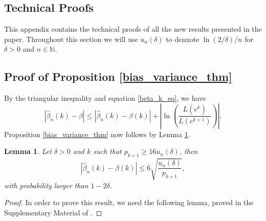 \documentclass[sn-mathphys-ay]{sn-jnl}%
\newtheorem{lemma}{Lemma}[section]
\newcommand{\N}{\mathbb{N}}
\begin{document}

\newpage

\setcounter{page}{1}

\begin{appendices}
\section{Technical Proofs}\label{sec:proofs}

This appendix contains the technical proofs of all the new results presented in the
paper. Throughout this section we will use $u_n(\delta)$ to denxote $\ln \left(
    {2/\delta } \right)/n$ for $\delta>0$ and $n\in\N$.

\subsection{Proof of Proposition \ref{bias_variance_thm}}

By the triangular inequality and equation \eqref{beta_k_eq}, we have
\begin{equation*}
    \left|\widehat{\beta}_n(k)-\beta\right| \leq
    \left|\widehat{\beta}_n(k)-\beta(k)\right| + \left| \ln\left(\frac{L(e^{k})}{L(e^{k+1})}\right) \right|.
\end{equation*}
Proposition \ref{bias_variance_thm} now follows by Lemma \ref{varianceBoundLemma}.

\begin{lemma}\label{varianceBoundLemma}
    Let \(\delta>0\) and \(k\) such that \(p_{k+1}\geq 16u_n(\delta)\), then
    \begin{equation}\label{varianceBoundEq}
        \left|\widehat{\beta}_n(k)-\beta(k)\right|\leq 6\sqrt{\frac{u_n (\delta)}{p_{k+1}}},
    \end{equation}
    with probability larger than \(1-2\delta\).
\end{lemma}
\begin{proof}
    In order to prove this result, we need the following lemma, proved in the
    Supplementary Material of \cite{Carpentier2015}.


\end{proof}
\end{appendices}
\end{document}
